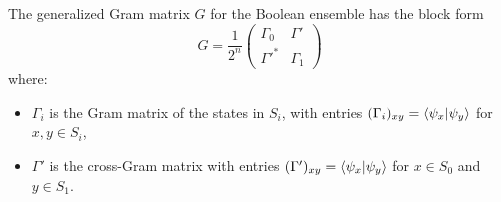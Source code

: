 \begin{lemma}\label{lem:ch5_qseq-gram-structure}
    The generalized Gram matrix $G$ for the Boolean ensemble has the block form
    \begin{equation}\label{eq:ch5_qseq-G-block}
        G = \frac{1}{2^n}
        \begin{pmatrix}
            \Gamma_0 & \Gamma' \\
            \Gamma'^{*} & \Gamma_1
        \end{pmatrix}
    \end{equation}
    where:
    \begin{itemize}
        \item $\Gamma_i$ is the Gram matrix of the states in $S_i$, with entries $(\Gamma_i)_{xy} = \braket{\psi_x}{\psi_y}$ for $x,y \in S_i$,
        \item $\Gamma'$ is the cross-Gram matrix with entries $(\Gamma')_{xy} = \braket{\psi_x}{\psi_y}$ for $x \in S_0$ and $y \in S_1$.
    \end{itemize}
\end{lemma}
\theoremstyle{plain}
\newtheorem*{booleangramsrestate}{Lemma~\ref{lem:ch5_qseq-gram-structure}}


